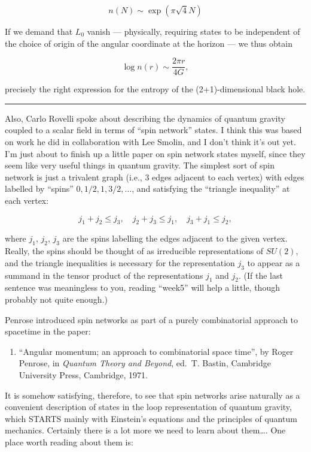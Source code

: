 \documentclass{article}
\def\tightlist{}
\begin{document}
\[n(N) \sim \exp(\pi \sqrt{4} N)\]

If we demand that \(L_0\) vanish --- physically, requiring states to be
independent of the choice of origin of the angular coordinate at the
horizon --- we thus obtain

\[\log n(r) \sim \frac{2 \pi r}{4G},\]

precisely the right expression for the entropy of the (2+1)-dimensional
black hole.

\begin{center}\rule{0.5\linewidth}{0.5pt}\end{center}

Also, Carlo Rovelli spoke about describing the dynamics of quantum
gravity coupled to a scalar field in terms of ``spin network'' states. I
think this was based on work he did in collaboration with Lee Smolin,
and I don't think it's out yet. I'm just about to finish up a little
paper on spin network states myself, since they seem like very useful
things in quantum gravity. The simplest sort of spin network is just a
trivalent graph (i.e., 3 edges adjacent to each vertex) with edges
labelled by ``spins'' \(0,1/2,1,3/2,\ldots\), and satisfying the
``triangle inequality'' at each vertex:

\[j_1 + j_2 \leqslant j_3, \quad j_2 + j_3 \leqslant j_1, \quad j_3 + j_1 \leqslant j_2,\]

where \(j_1\), \(j_2\), \(j_3\) are the spins labelling the edges
adjacent to the given vertex. Really, the spins should be thought of as
irreducible representations of \(SU(2)\), and the triangle inequalities
is necessary for the representation \(j_3\) to appear as a summand in
the tensor product of the representations \(j_1\) and \(j_2\). (If the
last sentence was meaningless to you, reading ``week5'' will help a
little, though probably not quite enough.)

Penrose introduced spin networks as part of a purely combinatorial
approach to spacetime in the paper:

\begin{enumerate}
\def\labelenumi{\arabic{enumi})}
\setcounter{enumi}{1}
\tightlist
\item
  ``Angular momentum; an approach to combinatorial space time'', by
  Roger Penrose, in \emph{Quantum Theory and Beyond}, ed.~T. Bastin,
  Cambridge University Press, Cambridge, 1971.
\end{enumerate}

It is somehow satisfying, therefore, to see that spin networks arise
naturally as a convenient description of states in the loop
representation of quantum gravity, which STARTS mainly with Einstein's
equations and the principles of quantum mechanics. Certainly there is a
lot more we need to learn about them\ldots. One place worth reading
about them is:
\end{document}
